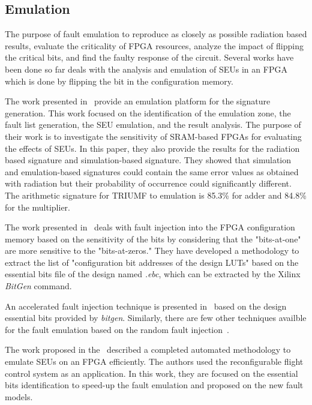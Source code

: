 \subsection{Emulation}

The purpose of fault emulation to reproduce as closely as possible radiation based results, evaluate the criticality of FPGA resources, analyze the impact of flipping the critical bits, and find the faulty response of the circuit. Several works have been done so far deals with the analysis and emulation of SEUs in an FPGA which is done by flipping the bit in the configuration memory. 

The work presented in~\cite{hobeika2014multi} provide an emulation platform for the signature generation. This work focused on the identification of the emulation zone, the fault list generation, the SEU emulation, and the result analysis. The purpose of their work is to investigate the sensitivity of SRAM-based FPGAs for evaluating the effects of SEUs. In this paper, they also provide the results for the radiation based signature and simulation-based signature. They showed that simulation and emulation-based signatures could contain the same error values as obtained with radiation but their probability of occurrence could significantly different. The arithmetic signature for TRIUMF to emulation is 85.3\% for adder and 84.8\% for the multiplier. 

The work presented in~\citep{souari2015optimization, souari2016towards} deals with fault injection into the FPGA configuration memory based on the sensitivity of the bits by considering that the "bits-at-one" are more sensitive to the "bits-at-zeros." They have developed a methodology to extract the list of "configuration bit addresses of the design LUTs" based on the essential bits file of the design named \textit{.ebc},  which can be extracted by the Xilinx \textit{BitGen} command.




An accelerated fault injection technique is presented in~\citep{di2014fault} based on the design essential bits provided by  \textit{bitgen}. Similarly, there are few other techniques availble for the fault emulation based on the random fault injection~\citep{faure2005single}.


The work proposed in the~\cite{hobeika2013flight} described a completed automated methodology to emulate SEUs on an FPGA efficiently. The authors used the reconfigurable flight control system as an application.
In this work, they are focused on the essential bits identification to speed-up the fault emulation and proposed on the new fault models.




